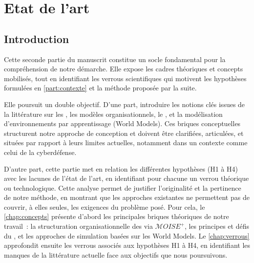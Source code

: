 \clearpage
\thispagestyle{empty}
\null
\newpage

\cleardoublepage
{}
\part{Etat de l'art}
\label{part:etat_art}

\clearpage
\thispagestyle{empty}
\null
\newpage

\chapter*{Introduction}

\noindent
Cette seconde partie du manuscrit constitue un socle fondamental pour la compréhension de notre démarche. Elle expose les cadres théoriques et concepts mobilisés, tout en identifiant les verrous scientifiques qui motivent les hypothèses formulées en \autoref{part:contexte} et la méthode proposée par la suite.

Elle poursuit un double objectif. D'une part, introduire les notions clés issues de la littérature sur les , les modèles organisationnels, le , et la modélisation d'environnements par apprentissage (World Models). Ces briques conceptuelles structurent notre approche de conception et doivent être clarifiées, articulées, et situées par rapport à leurs limites actuelles, notamment dans un contexte comme celui de la cyberdéfense.

D'autre part, cette partie met en relation les différentes hypothèses (H1 à H4) avec les lacunes de l'état de l'art, en identifiant pour chacune un verrou théorique ou technologique. Cette analyse permet de justifier l'originalité et la pertinence de notre méthode, en montrant que les approches existantes ne permettent pas de couvrir, à elles seules, les exigences du problème posé. Pour cela, le \autoref{chap:concepts} présente d'abord les principales briques théoriques de notre travail~: la structuration organisationnelle des  via $\mathcal{M}OISE^+$, les principes et défis du , et les approches de simulation basées sur les World Models. Le \autoref{chap:verrous} approfondit ensuite les verrous associés aux hypothèses H1 à H4, en identifiant les manques de la littérature actuelle face aux objectifs que nous poursuivons.

